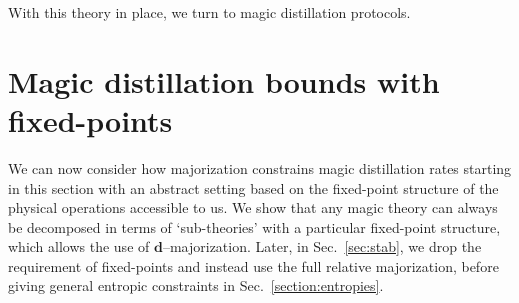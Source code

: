 \documentclass[pra,
aps,
twocolumn,
superscriptaddress,
groupedaddress,
nofootinbib,
reprint
]{revtex4-1}
\begin{document}
With this theory in place, we turn to magic distillation protocols.

\section{Magic distillation bounds with fixed-points}
\label{sec:frag}

We can now consider how majorization constrains magic distillation rates starting in this section with an abstract setting based on the fixed-point structure of the physical operations accessible to us. We show that any magic theory can always be decomposed in terms of `sub-theories' with a particular fixed-point structure, which allows the use of $\mathbf{d}$--majorization. Later, in Sec.~\ref{sec:stab}, we drop the requirement of fixed-points and instead use the full relative majorization, before giving general entropic constraints in Sec.~\ref{section:entropies}.
 
\end{document}
